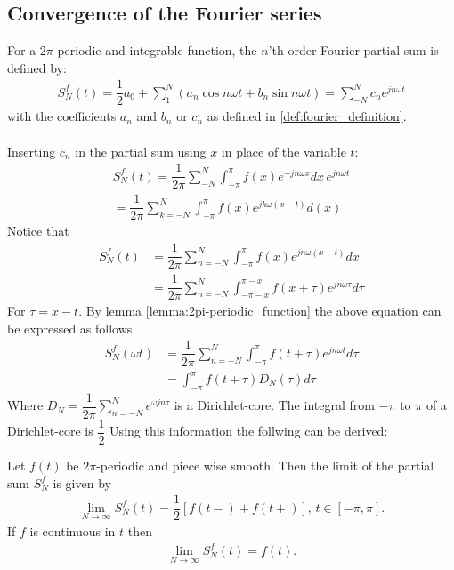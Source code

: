 \subsection{Convergence of the Fourier series}
For a $2\pi$-periodic and integrable function, the $n$'th order Fourier partial sum is defined by: 
\begin{align}\label{eq:partialsumFourierSeries}
	S_N^f(t) = \dfrac{1}{2} a_0 + \sum_1^N\left(a_n \cos n\omega t + b_n \sin n \omega t \right) = \sum_{-N}^N c_n e^{jn\omega t}
\end{align}
with the coefficients $a_n$ and $b_n$ or $c_n$ as defined in \ref{def:fourier_definition}.\\
\\
Inserting $c_n$ in the partial sum using $x$ in place of the variable $t$:
\begin{align*}
	S_N^f(t)
	= \dfrac{1}{2\pi}\sum_{-N}^N \int_{-\pi}^\pi f(x) e^{-j n \omega x} dx\, e^{jn\omega t}\\
	= \dfrac{1}{2\pi}\sum_{k = -N}^N \int_{-\pi}^\pi f(x) e^{j k \omega (x-t)} d(x)
\end{align*}
Notice that 
\begin{align*}
	S_N^f (t) 
	&= \dfrac{1}{2\pi} \sum_{n=-N}^N \int_{-\pi}^\pi f(x)e^{jn\omega(x-t)} dx \\
	&= \dfrac{1}{2\pi} \sum_{n = -N}^N \int_{-\pi - x}^{\pi - x} f(x + \tau ) e^{j n\omega \tau} d\tau
\end{align*}
For $\tau = x-t$. By lemma \ref{lemma:2pi-periodic_function} the above equation can be expressed as follows
\begin{align*}
	S_N^f (\omega t) 
	&= \dfrac{1}{2\pi} \sum_{n=-N}^N \int_{-\pi}^\pi f(t + \tau) e^{jn \omega t} d\tau\\
	&= \int_{-\pi}^\pi f(t + \tau) D_N(\tau) d\tau
\end{align*}
Where $D_N = \dfrac{1}{2\pi}\sum_{n=-N}^{N}e^{\omega jn\tau}$ is a Dirichlet-core. 
The integral from $-\pi$ to $\pi$ of a Dirichlet-core is $\dfrac{1}{2}$ 
Using this information the follwing can be derived:
\begin{theorem}
	Let $f(t)$ be $2\pi$-periodic and piece wise smooth. Then the limit of the partial sum $S_N^f$ is given by
	 \begin{align*}
	 	\lim_{N\to\infty} S_N^f (t) = \dfrac{1}{2}\left[f(t-) + f(t+)\right], \, t \in [-\pi, \pi].
	 \end{align*}
	If $f$ is continuous in $t$ then
	\begin{align*}
		\lim_{N\to \infty} S_N^f(t) = f(t).
	\end{align*}
\end{theorem}
